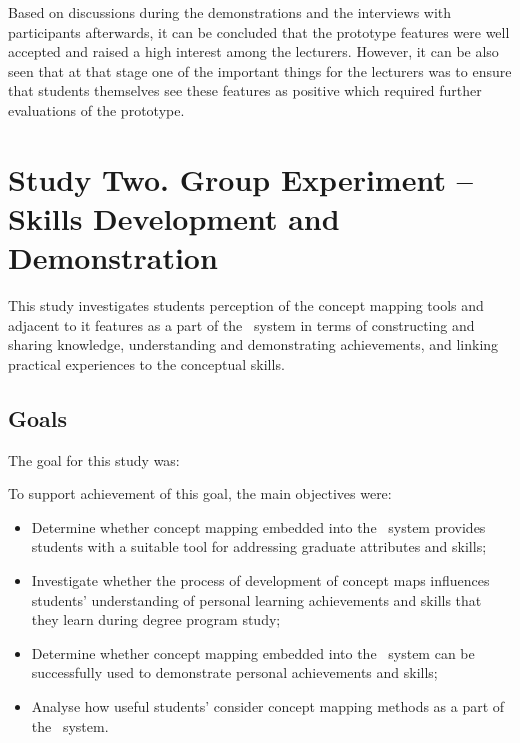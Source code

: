 Based on discussions during the demonstrations and the interviews with
participants afterwards, it can be concluded that the prototype features were
well accepted and raised a high interest among the lecturers. However, it can be
also seen that at that stage one of the important things for the lecturers was
to ensure that students themselves see these features as positive which
required further evaluations of the prototype.

\section{Study Two. Group Experiment -- \LLLc Skills Development and
Demonstration}
\label{sec:two}

This study investigates students perception of the concept mapping tools and
adjacent to it features as a part of the \ep~system in terms of constructing
and sharing knowledge, understanding and demonstrating achievements, and linking
practical experiences to the conceptual skills.

\subsection{Goals}
The goal for this study was:


To support achievement of this goal, the main objectives were:

\begin{itemize}
  \item Determine whether concept mapping embedded into the \ep~system provides
  students with a suitable tool for addressing graduate attributes and \LLLs
  skills;
  \item Investigate whether the process of development of concept maps
  influences students' understanding of personal learning achievements and
  skills that they learn during degree program study;
  \item Determine whether concept mapping embedded into the \ep~system can be
  successfully used to demonstrate personal achievements and skills;
  \item Analyse how useful students' consider concept mapping methods as a part
  of the \ep~system.
\end{itemize}

